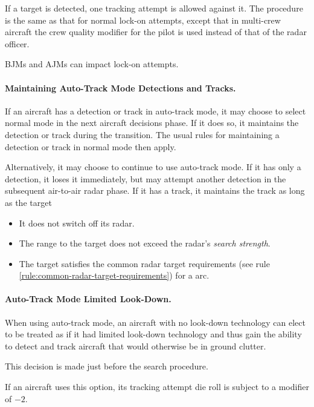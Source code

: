 \begin{advancedrules}
{If a target is detected, one tracking attempt is allowed against it. The procedure is the same as that for normal lock-on attempts, except that in  multi-crew aircraft the crew quality modifier for the pilot is used instead of that of the radar officer.

BJMs and AJMs can impact lock-on attempts.

\paragraph{Maintaining Auto-Track Mode Detections and Tracks.}

If an aircraft has a detection or track in auto-track mode, it may choose to select normal mode in the next aircraft decisions phase. If it does so, it maintains the detection or track during the transition. The usual rules for maintaining a detection or track in normal mode then apply.

Alternatively, it may choose to continue to use auto-track mode. If it has only a detection, it loses it immediately, but may attempt another detection in the subsequent air-to-air radar phase. If it has a track, it maintains the track as long as the target
\begin{itemize}
    \item It does not switch off its radar.
    \item The range to the target does not exceed the radar's \emph{search strength}.
    \item The target satisfies the common radar target requirements (see rule \ref{rule:common-radar-target-requirements}) for a  arc.
\end{itemize}

\paragraph{Auto-Track Mode Limited Look-Down.}

When using auto-track mode, an aircraft with no look-down technology can elect to be treated as if it had limited look-down technology and thus gain the ability to detect and track aircraft that would otherwise be in ground clutter.

This decision is made just before the search procedure. 

If an aircraft uses this option, its tracking attempt die roll is subject to a modifier of $-2$. 


}

\end{advancedrules}
